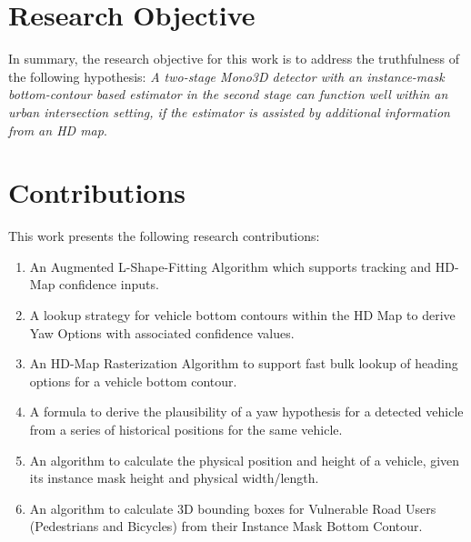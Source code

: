 \section{Research Objective}
\label{sec:objective}

In summary, the research objective for this work is to address the truthfulness of the following hypothesis: \textit{A two-stage \textit{Mono3D} detector with an instance-mask bottom-contour based estimator in the second stage can function well within an urban intersection setting, if the estimator is assisted by additional information from an HD map}.

\section{Contributions}
\label{sec:contributions}

This work presents the following research contributions:

\begin{enumerate}
    \item An Augmented L-Shape-Fitting Algorithm which supports tracking and HD-Map confidence inputs.
    \item A lookup strategy for vehicle bottom contours within the HD Map to derive Yaw Options with associated confidence values.
    \item An HD-Map Rasterization Algorithm to support fast bulk lookup of heading options for a vehicle bottom contour.
    \item A formula to derive the plausibility of a yaw hypothesis for a detected vehicle from a series of historical positions for the same vehicle.
    \item An algorithm to calculate the physical position and height of a vehicle, given its instance mask height and physical width/length.
    \item An algorithm to calculate 3D bounding boxes for Vulnerable Road Users (Pedestrians and Bicycles) from their Instance Mask Bottom Contour.
\end{enumerate}
